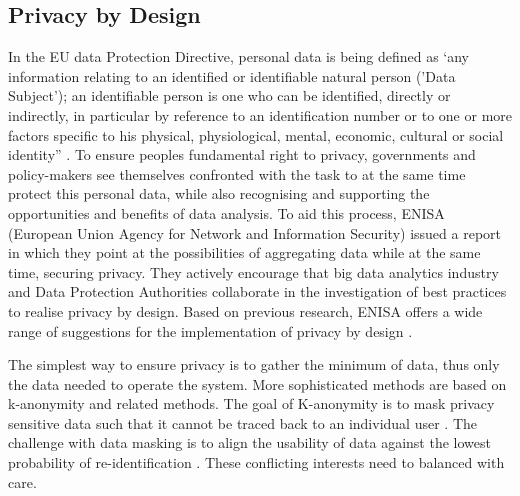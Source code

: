 \subsection{Privacy by Design}
\label{sec:pbd}
In the EU data Protection Directive, personal data is being defined as ‘any information relating to an identified or identifiable natural person ('Data Subject'); an identifiable person is one who can be identified, directly or indirectly, in particular by reference to an identification number or to one or more factors specific to his physical, physiological, mental, economic, cultural or social identity” \cite{european_data_protection}. 
To ensure peoples fundamental right to privacy, governments and policy-makers see themselves confronted with the task to at the same time protect this personal data, while also recognising and supporting the opportunities and benefits of data analysis.
To aid this process, ENISA (European Union Agency for Network and Information Security) issued a report in which they point at the possibilities of aggregating data while at the same time, securing privacy. 
They actively encourage that big data analytics industry and Data Protection Authorities collaborate in the investigation of best practices to realise privacy by design. 
Based on previous research, ENISA offers a wide range of suggestions for the implementation of privacy by design \cite{d2015privacy}.

The simplest way to ensure privacy is to gather the minimum of data, thus only the data needed to operate the system. 
More sophisticated methods are based on k-anonymity and related methods. The goal of K-anonymity is to mask privacy sensitive data such that it cannot be traced back to an individual user \cite{sweeney2002k}. 
The challenge with data masking is to align the usability of data against the lowest probability of re-identification \cite{d2015privacy}. 
These conflicting interests need to balanced with care.





